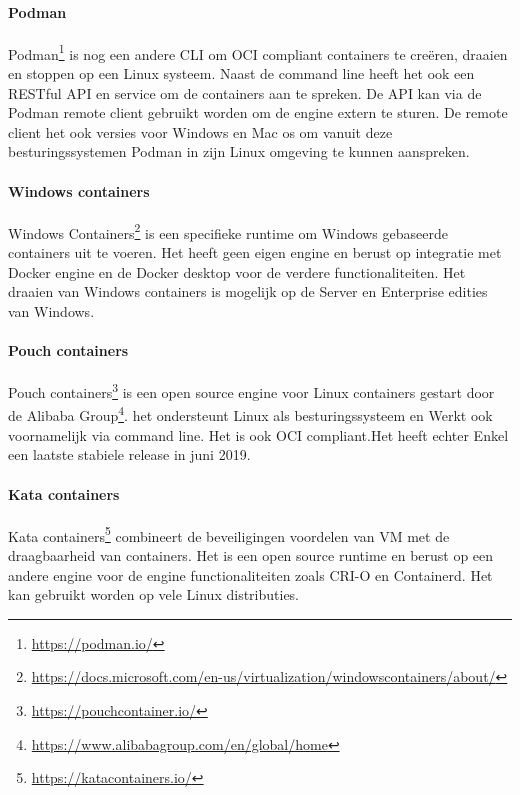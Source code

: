 \paragraph{Podman}
Podman\footnote{\url{https://podman.io/}} is nog een andere CLI om OCI compliant containers te creëren, draaien en stoppen op een Linux systeem. Naast de command line heeft het ook een RESTful API en service om de containers aan te spreken. De API kan via de Podman remote client gebruikt worden om de engine extern te sturen. De remote client het ook versies voor Windows en Mac os om vanuit deze besturingssystemen Podman in zijn Linux omgeving te kunnen aanspreken.
\paragraph{Windows containers}
Windows Containers\footnote{\url{https://docs.microsoft.com/en-us/virtualization/windowscontainers/about/}} is een specifieke runtime om Windows gebaseerde containers uit te voeren. Het heeft geen eigen engine en berust op integratie met Docker engine en de Docker desktop voor de verdere functionaliteiten.  Het draaien van Windows containers is mogelijk op de Server en Enterprise edities van Windows.
\paragraph{Pouch containers}
Pouch containers\footnote{\url{https://pouchcontainer.io/}} is een open source engine voor Linux containers gestart door de Alibaba Group\footnote{\url{https://www.alibabagroup.com/en/global/home}}. het ondersteunt Linux als besturingssysteem en Werkt ook voornamelijk via command line. Het is ook OCI compliant.Het heeft echter Enkel een laatste stabiele release in juni 2019.
\paragraph{Kata containers}
Kata containers\footnote{\url{https://katacontainers.io/}} combineert de beveiligingen voordelen van VM met de draagbaarheid van containers.  Het is een open source runtime en berust op een andere engine voor  de engine functionaliteiten zoals CRI-O en Containerd. Het kan gebruikt worden op vele Linux distributies.
